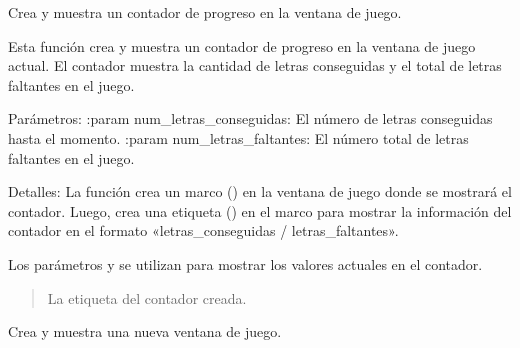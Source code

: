\documentclass[letterpaper,10pt,spanish]{sphinxmanual}
\begin{document}
\begin{fulllineitems}
\begin{fulllineitems}
\begin{quote}
\begin{description}
\end{description}\end{quote}

\end{fulllineitems}


\begin{fulllineitems}
\label{\detokenize{juego:juego.Juego.crear_contador}}
\pysigstartsignatures
{}
\pysigstopsignatures
\sphinxAtStartPar
Crea y muestra un contador de progreso en la ventana de juego.

\sphinxAtStartPar
Esta función crea y muestra un contador de progreso en la ventana de juego actual.
El contador muestra la cantidad de letras conseguidas y el total de letras faltantes
en el juego.

\sphinxAtStartPar
Parámetros:
:param num\_letras\_conseguidas: El número de letras conseguidas hasta el momento.
:param num\_letras\_faltantes: El número total de letras faltantes en el juego.

\sphinxAtStartPar
Detalles:
La función crea un marco () en la ventana de juego donde se mostrará
el contador. Luego, crea una etiqueta () en el marco para mostrar
la información del contador en el formato «letras\_conseguidas / letras\_faltantes».

\sphinxAtStartPar
Los parámetros  y  se utilizan para
mostrar los valores actuales en el contador.
\begin{quote}\begin{description}
\sphinxAtStartPar
La etiqueta del contador creada.

\end{description}\end{quote}

\end{fulllineitems}


\begin{fulllineitems}
\label{\detokenize{juego:juego.Juego.crear_ventana}}
\pysigstartsignatures
{}
\pysigstopsignatures
\sphinxAtStartPar
Crea y muestra una nueva ventana de juego.


\end{fulllineitems}
\end{fulllineitems}
\end{document}
